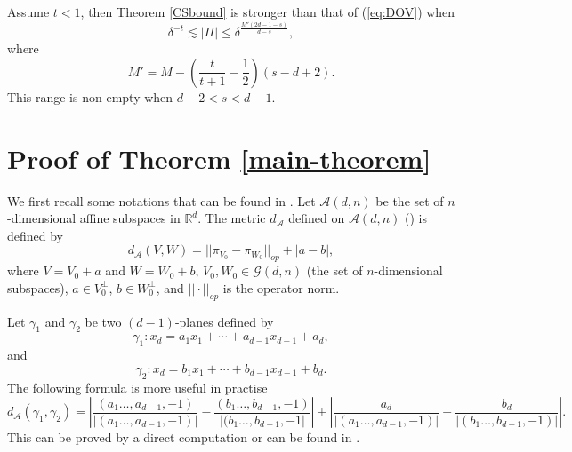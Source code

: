 \documentclass[11pt]{article}
\newcommand{\1}{\mathbf{1}}
\begin{document}
Assume $t<1$, then Theorem \ref{CSbound} is stronger than that of (\ref{eq:DOV}) when
\[\delta^{-t}\lesssim |\Pi|\le \delta^{\frac{M'(2d-1-s)}{d-s}},\]
where
\[M'=M-\left(\frac{t}{t+1}-\frac{1}{2}\right)(s-d+2).\]
This range is non-empty when $ d-2<s<d-1$.









\section{Proof of Theorem \ref{main-theorem}}
We first recall some notations that can be found in \cite{DOV}. Let $\mathcal{A}(d, n)$ be the set of $n$-dimensional affine subspaces in $\mathbb{R}^d$. The metric $d_{\mathcal{A}}$ defined on $\mathcal{A}(d, n)$ (\cite[page 53]{M95}) is defined by
\[d_{\mathcal{A}}(V, W)=||\pi_{V_0}-\pi_{W_0}||_{op}+|a-b|,\]
where $V=V_0+a$ and $W=W_0+b$, $V_0, W_0\in \mathcal{G}(d, n)$ (the set of $n$-dimensional subspaces), $a\in V_0^\perp$, $b\in W_0^\perp$, and $||\cdot ||_{op}$ is the operator norm.

Let $\gamma_1$ and $\gamma_2$ be two $(d-1)$-planes defined by
\[\gamma_1\colon x_d=a_1x_1+\cdots+a_{d-1}x_{d-1}+a_d,\]
and
\[\gamma_2\colon x_d=b_1x_1+\cdots+b_{d-1}x_{d-1}+b_d.\]
The following formula is more useful in practise
\[d_\mathcal{A}\left(\gamma_1,\gamma_2\right) = \left|\dfrac{(a_1\ldots,a_{d-1},-1)}{\left|(a_1\ldots,a_{d-1},-1)\right|}-\dfrac{(b_1\ldots,b_{d-1},-1)}{\left|(b_1\ldots,b_{d-1},-1\right|}\right|+\left|\dfrac{a_d}{\left|(a_1\ldots,a_{d-1},-1)\right|}-\dfrac{b_d}{\left|(b_1\ldots,b_{d-1},-1)\right|}\right|.\]
This can be proved by a direct computation or can be found in \cite[Lemma 2.5]{HPab}.
\end{document}
